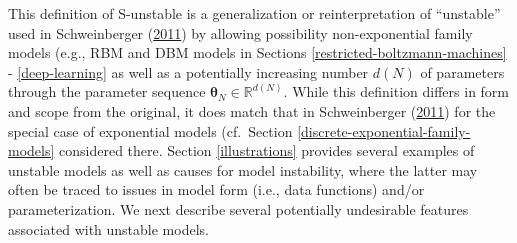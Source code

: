 \documentclass[12pt]{article}
\theoremstyle{definition}
\begin{document}
This definition of S-unstable is a generalization or reinterpretation of
``unstable'' used in Schweinberger
(\protect\hyperlink{ref-schweinberger2011instability}{2011}) by allowing
possibility non-exponential family models (e.g., RBM and DBM models in
Sections \ref{restricted-boltzmann-machines} - \ref{deep-learning} as
well as a potentially increasing number \(d(N)\) of parameters through
the parameter sequence \(\boldsymbol \theta_N\in \mathbb{R}^{d(N)}\).
While this definition differs in form and scope from the original, it
does match that in Schweinberger
(\protect\hyperlink{ref-schweinberger2011instability}{2011}) for the
special case of exponential models (cf.~Section
\ref{discrete-exponential-family-models} considered there. Section
\ref{illustrations} provides several examples of unstable models as well
as causes for model instability, where the latter may often be traced to
issues in model form (i.e., data functions) and/or parameterization. We
next describe several potentially undesirable features associated with
unstable models.
\end{document}
